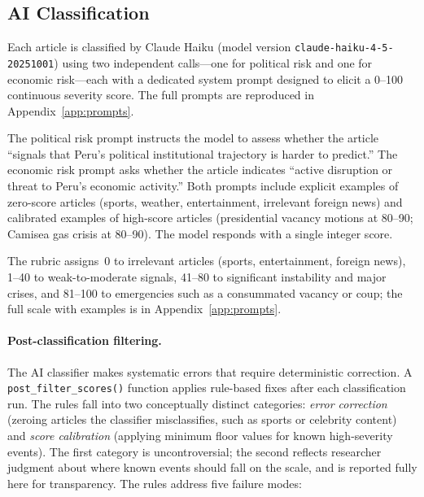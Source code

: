 \documentclass[12pt,a4paper]{article}
\begin{document}
\subsection{AI Classification}
\label{subsec:classification}

Each article is classified by Claude Haiku (model version
\texttt{claude-haiku-4-5-20251001}) using two independent calls---one for
political risk and one for economic risk---each with a dedicated system
prompt designed to elicit a 0--100 continuous severity score.  The full
prompts are reproduced in Appendix~\ref{app:prompts}.

The political risk prompt instructs the model to assess whether the
article ``signals that Peru's political institutional trajectory is harder
to predict.'' The economic risk prompt asks whether the article indicates
``active disruption or threat to Peru's economic activity.''  Both prompts
include explicit examples of zero-score articles (sports, weather,
entertainment, irrelevant foreign news) and calibrated examples of
high-score articles (presidential vacancy motions at 80--90; Camisea gas
crisis at 80--90).  The model responds with a single integer score.

The rubric assigns~0 to irrelevant articles (sports, entertainment, foreign news), 1--40 to weak-to-moderate signals, 41--80 to significant instability and major crises, and 81--100 to emergencies such as a consummated vacancy or coup; the full scale with examples is in Appendix~\ref{app:prompts}.

\paragraph{Post-classification filtering.}
The AI classifier makes systematic errors that require deterministic
correction.  A \texttt{post\_filter\_scores()} function applies rule-based
fixes after each classification run.  The rules fall into two conceptually
distinct categories: \emph{error correction} (zeroing articles the
classifier misclassifies, such as sports or celebrity content) and
\emph{score calibration} (applying minimum floor values for known
high-severity events).  The first category is uncontroversial; the second
reflects researcher judgment about where known events should fall on the
scale, and is reported fully here for transparency.  The rules address five
failure modes:
\end{document}
